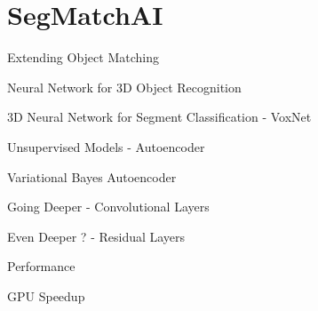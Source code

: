 \chapter{SegMatchAI}
\label{sec:segmatchAI}

Extending Object Matching

Neural Network for 3D Object Recognition

3D Neural Network for Segment Classification - VoxNet

Unsupervised Models - Autoencoder

Variational Bayes Autoencoder

Going Deeper - Convolutional Layers

Even Deeper ? - Residual Layers

Performance

GPU Speedup

